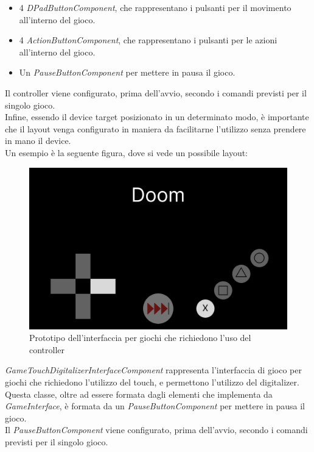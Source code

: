 \begin{itemize}
    \item 4 \emph{DPadButtonComponent}, che rappresentano i pulsanti per il movimento all'interno del gioco.
    \item 4 \emph{ActionButtonComponent}, che rappresentano i pulsanti per le azioni\\ all'interno del gioco.
    \item Un \emph{PauseButtonComponent} per mettere in pausa il gioco.
\end{itemize}
Il controller viene configurato, prima dell'avvio, secondo i comandi previsti per il singolo gioco.\\
Infine, essendo il device target posizionato in un determinato modo, è importante che il layout venga configurato in maniera da facilitarne l'utilizzo senza prendere in mano il device.\\
Un esempio è la seguente figura, dove si vede un possibile layout:
\begin{figure}[h]
    \centering
    \includegraphics[width=340pt]{images/prog/ControllerMockup.png}
    \caption{Prototipo dell'interfaccia per giochi che richiedono l'uso del controller}
    \label{fig:controller}
\end{figure}
\emph{GameTouchDigitalizerInterfaceComponent} rappresenta l'interfaccia di gioco per giochi che richiedono l'utilizzo del touch, e permettono l'utilizzo del digitalizer.\\
Questa classe, oltre ad essere formata dagli elementi che implementa da \emph{GameInterface}, è formata da un \emph{PauseButtonComponent} per mettere in pausa il gioco.\\
Il \emph{PauseButtonComponent} viene configurato, prima dell'avvio, secondo i comandi previsti per il singolo gioco.\\
